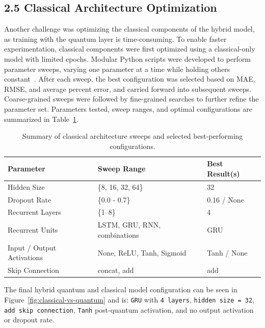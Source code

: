 \documentclass[10pt]{article}
\begin{document}
\subsection*{2.5 Classical Architecture Optimization}
Another challenge was optimizing the classical components of the hybrid model, as training with the quantum layer is time-consuming. To enable faster experimentation, classical components were first optimized using a classical-only model with limited epochs. Modular Python scripts were developed to perform parameter sweeps, varying one parameter at a time while holding others constant~\cite{madisson2019stockrnn, kalita2023rnn, saeed2023rnnmath}. After each sweep, the best configuration was selected based on MAE, RMSE, and average percent error, and carried forward into subsequent sweeps. Coarse-grained sweeps were followed by fine-grained searches to further refine the parameter set. Parameters tested, sweep ranges, and optimal configurations are summarized in Table~\ref{tab:classical-sweep-summary}.

\begin{table}[H]
\centering
\scriptsize  %
\setlength{\tabcolsep}{4pt}  %
\renewcommand{\arraystretch}{1.1}  %
\begin{tabular}{|l|l|l|}
\hline
\textbf{Parameter} & \textbf{Sweep Range} & \textbf{Best Result(s)} \\ \hline
Hidden Size & \{8, 16, 32, 64\} & 32 \\ \hline
Dropout Rate & \{0.0 - 0.7\} & 0.16 / None \\ \hline
Recurrent Layers & \{1–8\} & 4 \\ \hline
Recurrent Units & LSTM, GRU, RNN, combinations & GRU \\ \hline
Input / Output Activations & None, ReLU, Tanh, Sigmoid & Tanh / None \\ \hline
Skip Connection & concat, add & add \\ \hline
\end{tabular}
\caption{\scriptsize Summary of classical architecture sweeps and selected best-performing configurations.}
\label{tab:classical-sweep-summary}
\end{table}


The final hybrid quantum and classical model configuration can be seen in Figure~\ref {fig:classical-vs-quantum} and is: \texttt{GRU} with \texttt{4 layers}, \texttt{hidden size = 32}, \texttt{add skip connection}, \texttt{Tanh} post-quantum activation, and no output activation or dropout rate.
\end{document}
